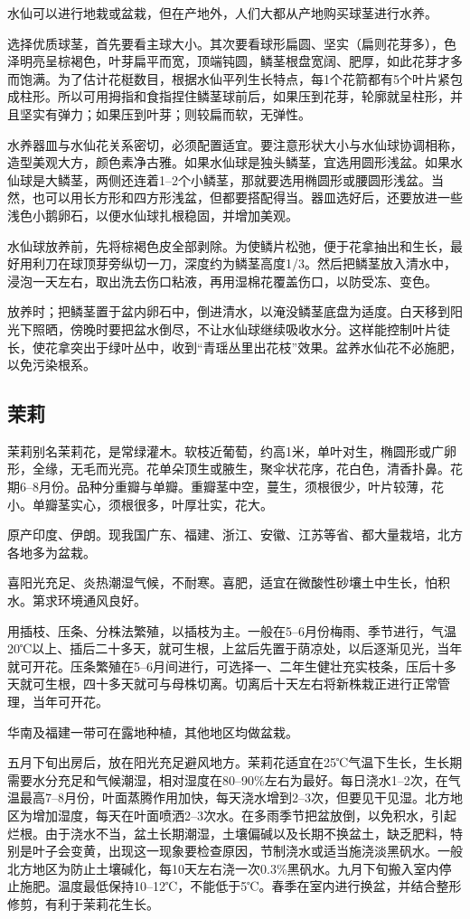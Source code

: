 \documentclass{ctexbook}
\begin{document}
水仙可以进行地栽或盆栽，但在产地外，人们大都从产地购买球茎进行水养。

选择优质球茎，首先要看主球大小。其次要看球形扁圆、坚实（扁则花芽多），色泽明亮呈棕褐色，叶芽扁平而宽，顶端钝圆，鳞茎根盘宽阔、肥厚，如此花芽才多而饱满。为了估计花梃数目，根据水仙平列生长特点，每1个花箭都有5个叶片紧包成柱形。所以可用拇指和食指捏住鳞茎球前后，如果压到花芽，轮廓就呈柱形，并且坚实有弹力；如果压到叶芽；则较扁而软，无弹性。

水养器皿与水仙花关系密切，必须配置适宜。要注意形状大小与水仙球协调相称，造型美观大方，颜色素净古雅。如果水仙球是独头鳞茎，宜选用圆形浅盆。如果水仙球是大鳞茎，两侧还连着1--2个小鳞茎，那就要选用椭圆形或腰圆形浅盆。当然，也可以用长方形和四方形浅盆，但都要搭配得当。器皿选好后，还要放进一些浅色小鹅卵石，以便水仙球扎根稳固，并增加美观。

水仙球放养前，先将棕褐色皮全部剥除。为使鳞片松弛，便于花拿抽出和生长，最好用利刀在球顶芽旁纵切一刀，深度约为鳞茎高度1/3。然后把鳞茎放入清水中，浸泡一天左右，取出洗去伤口粘液，再用湿棉花覆盖伤口，以防受冻、变色。

放养时；把鳞茎置于盆内卵石中，倒进清水，以淹没鳞茎底盘为适度。白天移到阳光下照晒，傍晚时要把盆水倒尽，不让水仙球继续吸收水分。这样能控制叶片徒长，使花拿突出于绿叶丛中，收到“青瑶丛里出花枝”效果。盆养水仙花不必施肥，以免污染根系。

\subsection{茉莉}
茉莉别名茉莉花，是常绿灌木。软枝近葡萄，约高1米，单叶对生，椭圆形或广卵形，全缘，无毛而光亮。花单朵顶生或腋生，聚伞状花序，花白色，清香扑鼻。花期6--8月份。品种分重瓣与单瓣。重瓣茎中空，蔓生，须根很少，叶片较薄，花小。单瓣茎实心，须根很多，叶厚壮实，花大。

原产印度、伊朗。现我国广东、福建、浙江、安徽、江苏等省、都大量栽培，北方各地多为盆栽。

喜阳光充足、炎热潮湿气候，不耐寒。喜肥，适宜在微酸性砂壤土中生长，怕积水。第求环境通风良好。

用插枝、压条、分株法繁殖，以插枝为主。一般在5--6月份梅雨、季节进行，气温20℃以上、插后二十多天，就可生根，上盆后先置于荫凉处，以后逐渐见光，当年就可开花。压条繁殖在5--6月间进行，可选择一、二年生健壮充实枝条，压后十多天就可生根，四十多天就可与母株切离。切离后十天左右将新株栽正进行正常管理，当年可开花。

华南及福建一带可在露地种植，其他地区均做盆栽。

五月下旬出房后，放在阳光充足避风地方。茉莉花适宜在25℃气温下生长，生长期需要水分充足和气候潮湿，相对湿度在80--90\%左右为最好。每日浇水1--2次，在气温最高7--8月份，叶面蒸腾作用加快，每天浇水增到2--3次，但要见干见湿。北方地区为增加湿度，每天在叶面喷洒2--3次水。在多雨季节把盆放倒，以免积水，引起烂根。由于浇水不当，盆土长期潮湿，土壤偏碱以及长期不换盆土，缺乏肥料，特别是叶子会变黄，出现这一现象要检查原因，节制浇水或适当施浇淡黑矾水。一般北方地区为防止土壤碱化，每10天左右浇一次0.3\%黑矾水。九月下旬搬入室内停止施肥。温度最低保持10--12℃，不能低于5℃。春季在室内进行换盆，并结合整形修剪，有利于茉莉花生长。
\end{document}
